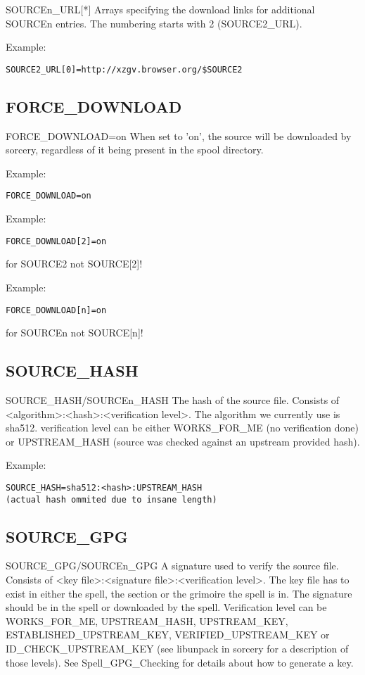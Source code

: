 \documentclass[a4paper,10pt]{book}
\begin{document}
SOURCEn\_URL[*]
	Arrays specifying the download links for additional SOURCEn entries.
	The numbering starts with 2 (SOURCE2\_URL).

Example:
\begin{verbatim}
SOURCE2_URL[0]=http://xzgv.browser.org/$SOURCE2
\end{verbatim}

\subsection{FORCE\_DOWNLOAD}
FORCE\_DOWNLOAD=on
	When set to 'on', the source will be downloaded by sorcery,
	regardless of it being present in the spool directory.

Example:
\begin{verbatim}
FORCE_DOWNLOAD=on
\end{verbatim}

Example:
\begin{verbatim}
FORCE_DOWNLOAD[2]=on
\end{verbatim}
for SOURCE2 not SOURCE[2]!

Example:
\begin{verbatim}
FORCE_DOWNLOAD[n]=on
\end{verbatim}
for SOURCEn not SOURCE[n]!

\subsection{SOURCE\_HASH}
SOURCE\_HASH/SOURCEn\_HASH
	The hash of the source file. Consists of
	<algorithm>:<hash>:<verification level>. The algorithm we currently
	use is sha512. verification level can be either WORKS\_FOR\_ME (no
	verification done) or UPSTREAM\_HASH (source was checked against an
	upstream provided hash).

Example:
\begin{verbatim}
SOURCE_HASH=sha512:<hash>:UPSTREAM_HASH
(actual hash ommited due to insane length)
\end{verbatim}

\subsection{SOURCE\_GPG}
SOURCE\_GPG/SOURCEn\_GPG
	A signature used to verify the source file. Consists of
	<key file>:<signature file>:<verification level>. The key file has to
	exist in either the spell, the section or the grimoire the spell is
	in. The signature should be in the spell or downloaded by the spell.
	Verification level can be WORKS\_FOR\_ME, UPSTREAM\_HASH,
UPSTREAM\_KEY,
	ESTABLISHED\_UPSTREAM\_KEY, VERIFIED\_UPSTREAM\_KEY or
	ID\_CHECK\_UPSTREAM\_KEY (see libunpack in sorcery for a description of
	those levels). See Spell\_GPG\_Checking for details about how to
	generate a key.
\end{document}
